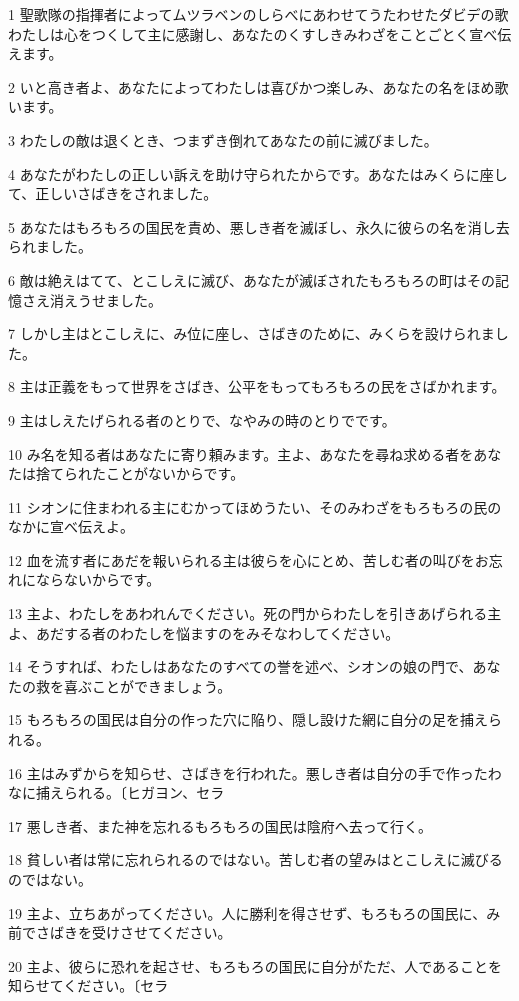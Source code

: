 \par 1 聖歌隊の指揮者によってムツラベンのしらべにあわせてうたわせたダビデの歌 わたしは心をつくして主に感謝し、あなたのくすしきみわざをことごとく宣べ伝えます。
\par 2 いと高き者よ、あなたによってわたしは喜びかつ楽しみ、あなたの名をほめ歌います。
\par 3 わたしの敵は退くとき、つまずき倒れてあなたの前に滅びました。
\par 4 あなたがわたしの正しい訴えを助け守られたからです。あなたはみくらに座して、正しいさばきをされました。
\par 5 あなたはもろもろの国民を責め、悪しき者を滅ぼし、永久に彼らの名を消し去られました。
\par 6 敵は絶えはてて、とこしえに滅び、あなたが滅ぼされたもろもろの町はその記憶さえ消えうせました。
\par 7 しかし主はとこしえに、み位に座し、さばきのために、みくらを設けられました。
\par 8 主は正義をもって世界をさばき、公平をもってもろもろの民をさばかれます。
\par 9 主はしえたげられる者のとりで、なやみの時のとりでです。
\par 10 み名を知る者はあなたに寄り頼みます。主よ、あなたを尋ね求める者をあなたは捨てられたことがないからです。
\par 11 シオンに住まわれる主にむかってほめうたい、そのみわざをもろもろの民のなかに宣べ伝えよ。
\par 12 血を流す者にあだを報いられる主は彼らを心にとめ、苦しむ者の叫びをお忘れにならないからです。
\par 13 主よ、わたしをあわれんでください。死の門からわたしを引きあげられる主よ、あだする者のわたしを悩ますのをみそなわしてください。
\par 14 そうすれば、わたしはあなたのすべての誉を述べ、シオンの娘の門で、あなたの救を喜ぶことができましょう。
\par 15 もろもろの国民は自分の作った穴に陥り、隠し設けた網に自分の足を捕えられる。
\par 16 主はみずからを知らせ、さばきを行われた。悪しき者は自分の手で作ったわなに捕えられる。〔ヒガヨン、セラ
\par 17 悪しき者、また神を忘れるもろもろの国民は陰府へ去って行く。
\par 18 貧しい者は常に忘れられるのではない。苦しむ者の望みはとこしえに滅びるのではない。
\par 19 主よ、立ちあがってください。人に勝利を得させず、もろもろの国民に、み前でさばきを受けさせてください。
\par 20 主よ、彼らに恐れを起させ、もろもろの国民に自分がただ、人であることを知らせてください。〔セラ

